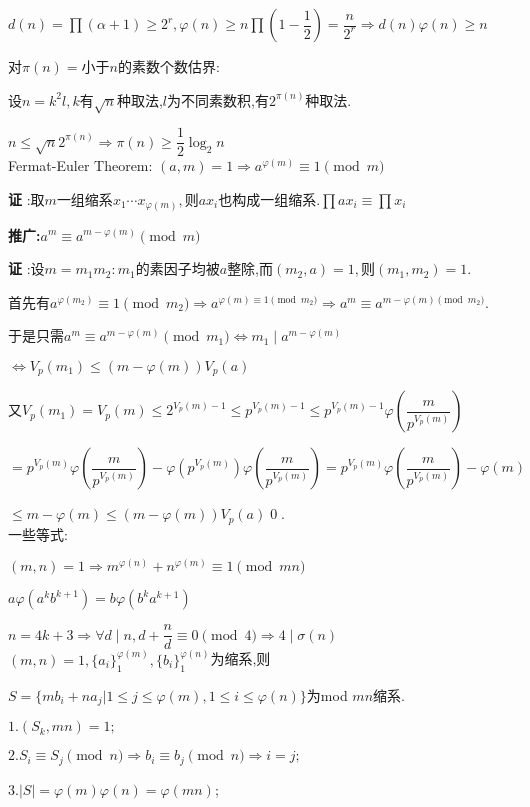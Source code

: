 $ d(n)=\prod{(\alpha+1)}\ge 2^r,\varphi(n)\ge n \prod{(1-\dfrac{1}{2})}=\dfrac{n}{2^r}\Rightarrow d(n)\varphi(n)\ge n$

对$ \pi(n)=$小于$ n$的素数个数估界: 

设$ n=k^2l,k$有$ \sqrt{n}$种取法,$ l$为不同素数积,有$ 2^{\pi(n)}$种取法.

$ n\le \sqrt{n}2^{\pi(n)}\Rightarrow \pi(n)\ge \dfrac{1}{2}\log_2n$
\\

Fermat-Euler Theorem:
$ (a,m)=1\Rightarrow a^{\varphi(m)}\equiv 1 \pmod m$

{\bf 证 }:取$ m$一组缩系$ x_1\cdots x_{\varphi(m)},$则$ ax_i$也构成一组缩系.$ \prod{ax_i}\equiv \prod{x_i}$

{\bf 推广:}$ a^m \equiv a^{m-\varphi(m)} \pmod m$

{\bf 证 }:设$ m=m_1m_2:m_1$的素因子均被$ a$整除,而$ (m_2,a)=1,$则$ (m_1,m_2)=1$.

首先有$ a^{\varphi(m_2)}\equiv 1 \pmod{m_2}\Rightarrow a^{\varphi(m)\equiv 1 \pmod{m_2}}\Rightarrow a^m\equiv a^{m-\varphi(m)\pmod{m_2}}$.

于是只需$ a^m\equiv a^{m-\varphi(m)}\pmod{m_1}\Leftrightarrow m_1\mid a^{m-\varphi(m)}$ 

$\Leftrightarrow V_p(m_1)\le (m-\varphi(m))V_p(a)$

又$ V_p(m_1)=V_p(m)\le2^{V_p(m)-1}\le p^{V_p(m)-1}\le p^{V_p(m)-1}\varphi(\dfrac{m}{p^{V_p(m)}})$ 

$=p^{V_p(m)}\varphi(\dfrac{m}{p^{V_p(m)}})-\varphi(p^{V_p(m)})\varphi(\dfrac{m}{p^{V_p(m)}})=p^{V_p(m)}\varphi(\dfrac{m}{p^{V_p(m)}})-\varphi(m)$ 

$\le m-\varphi(m)\le (m-\varphi(m))V_p(a)$\qed.
\\

一些等式:

$ (m,n)=1\Rightarrow m^{\varphi(n)}+n^{\varphi(m)}\equiv 1 \pmod{mn}$

$ a\varphi(a^kb^{k+1})=b\varphi(b^ka^{k+1})$

$n=4k+3 \Rightarrow \forall d \mid n ,d+\dfrac{n}{d}\equiv 0 \pmod 4\Rightarrow 4 \mid \sigma(n)$
\\

$ (m,n)=1,\{ a_i\}_{1}^{\varphi(m)},\{ b_i\}_1^{\varphi(n)}$为缩系,则

$ S=\{ mb_i+na_j | 1\le j\le \varphi(m),1\le i \le \varphi(n)\}$为mod $ mn$缩系.

$ 1.(S_k,mn)=1; $ 

$ 2.S_i\equiv S_j \pmod n\Rightarrow b_i\equiv b_j \pmod n\Rightarrow i=j;$ 

$ 3.|S|=\varphi(m)\varphi(n)=\varphi(mn)$;
